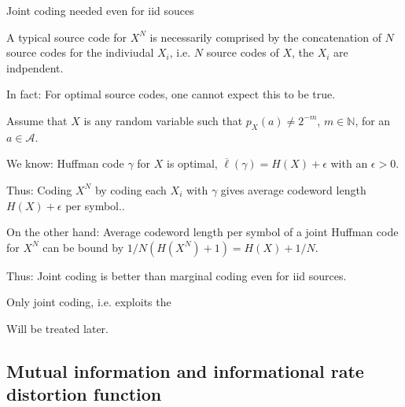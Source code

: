 \begin{frame}{Joint coding needed even for iid souces} 
\bit
\item A typical source code for $X^N$ is  necessarily comprised by the concatenation of $N$ 
source codes for the indiviudal $X_i$, i.e. $N$ source codes of $X$,  the $X_i$ are indpendent.
\item In fact:  For optimal source codes, one cannot expect this to be true. 
\eit
\vspace{-3.5mm}
\bit
\item  Assume that $X$ is any random variable such that $p_X(a)\neq 2^{-m}$, $m\in\mathbb{N}$, for an $a\in\mathcal{A}$. 
\item We know: Huffman code $\gamma$ for $X$ is optimal, 
$\overline{\ell}(\gamma)=H(X)+\epsilon$ with an $\epsilon>0$.
\item Thus: Coding $X^N$ by coding each $X_i$ with $\gamma$  gives average codeword length $H(X)+\epsilon$ per symbol..    
\item On the other hand: Average codeword length per symbol of a joint  Huffman code for $X^N$
can be bound by $1/N(H(X^N)+1)=H(X)+1/N$.
\item[\iarrow] Thus: Joint coding is better than marginal coding even for iid sources. 
\eit
\vspace{-2.5mm}
\bit
\item Only joint coding, i.e.  exploits the 
\item Will be treated later. 
\eit
\end{frame}

\subsection{Mutual information and informational rate distortion function}

